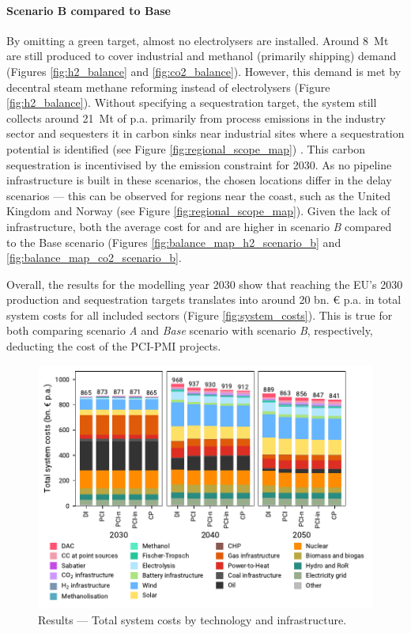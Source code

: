 \documentclass[preprint,12pt,sort&compress]{elsarticle}
\begin{document}
\paragraph{Scenario B compared to Base}
By omitting a green  target, almost no electrolysers are installed. Around \SI{8}{Mt} are still produced to cover industrial  and methanol (primarily shipping) demand (Figures \ref{fig:h2_balance} and \ref{fig:co2_balance}). However, this demand is met by decentral steam methane reforming instead of electrolysers (Figure \ref{fig:h2_balance}). 
Without specifying a  sequestration target, the system still collects around \SI{21}{Mt} of  p.a. primarily from process emissions in the industry sector and sequesters it in carbon sinks near industrial sites where a sequestration potential is identified (see Figure \ref{fig:regional_scope_map}) \cite{hofmannH2CO2Network2025}. This carbon sequestration is incentivised by the emission constraint for 2030. As no pipeline infrastructure is built in these scenarios, the chosen locations differ in the delay scenarios --- this can be observed for regions near the coast, such as the United Kingdom and Norway (see Figure \ref{fig:regional_scope_map}). Given the lack of infrastructure, both the average cost for  and  are higher in scenario \textit{B} compared to the Base scenario (Figures \ref{fig:balance_map_h2_scenario_b} and \ref{fig:balance_map_co2_scenario_b}.

Overall, the results for the modelling year 2030 show that reaching the EU's 2030  production and  sequestration targets translates into around 20 bn. \euro{} p.a. in total system costs for all included sectors (Figure \ref{fig:system_costs}). This is true for both comparing scenario \textit{A} and \textit{Base} scenario with scenario \textit{B}, respectively, deducting the cost of the PCI-PMI projects.

\begin{figure}[htbp]
  \centering
  \includegraphics[width=\linewidth]{costs_overview.pdf}
  \caption{Results --- Total system costs by technology and infrastructure.}
  \label{fig:costs_overview}
\end{figure}
\end{document}
